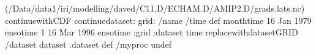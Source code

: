 \begin{ingrid}
(/Data/data1/iri/modelling/daved/C11.D/ECHAM.D/AMIP2.D/grads.lats.nc) continuewithCDF
continuedataset: 
grid:
/name /time def
monthtime
16 Jan 1979 ensotime
1
16 Mar 1996 ensotime
:grid
:dataset
time replacewithdatasetGRID
/dataset dataset .dataset def
/myproc undef
\end{ingrid}
